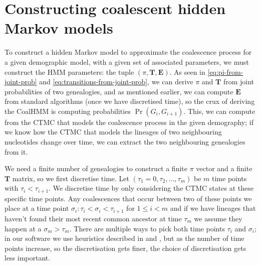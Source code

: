\documentclass[graybox]{svmult}
\newcommand{\T}{\ensuremath{\mathbf{T}}}
\renewcommand{\E}{\ensuremath{\mathbf{E}}}
\begin{document}
\section{Constructing coalescent hidden Markov models}

To construct a hidden Markov model to approximate the coalescence process for a given demographic model, with a given set of associated parameters, we must construct the HMM parameters: the tuple $(\pi,\T,\E)$. As seen in \eqref{eq:pi-from-joint-prob} and \eqref{eq:transitions-from-joint-prob}, we can derive $\pi$ and $\T$ from joint probabilities of two genealogies, and as mentioned earlier, we can compute $\E$ from standard algorithms (once we have discretised time), so the crux of deriving the CoalHMM is computing probabilities $\Pr(G_i,G_{i+1})$. This, we can compute from the CTMC that models the coalescence process in the given demography; if we know how the CTMC that models the lineages of two neighbouring nucleotides change over time, we can extract the two neighbouring genealogies from it.

We need a finite number of genealogies to construct a finite $\pi$ vector and a finite $\T$ matrix, so we first discretise time. Let $(\tau_1=0,\tau_2,\ldots,\tau_m)$ be $m$ time points with $\tau_i<\tau_{i+1}$. We discretise time by only considering the CTMC states at these specific time points. Any coalescences that occur between two of these points we place at a time point $\sigma_i: \tau_i < \sigma_i < \tau_{i+1}$ for $1 \leq i < m$ and if we have lineages that haven't found their most recent common ancestor at time $\tau_{m}$ we assume they happen at a $\sigma_m > \tau_m$. There are multiple ways to pick both time points $\tau_i$ and $\sigma_i$; in our software we use heuristics described in \citet{Mailund:2011dva} and \cite{Mailund:2012ewa}, but as the number of time points increase, so the discretisation gets finer, the choice of discretisation gets less important.
\end{document}
